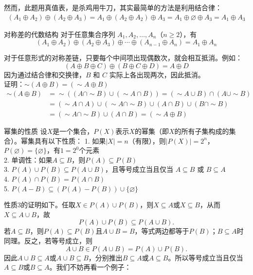 \documentclass[lang=cn,11pt]{elegantbook}
\begin{document}
然而，此题用真值表，是杀鸡用牛刀，其实最简单的方法是利用结合律：
\begin{align*}
(A_1 \oplus A_2) \oplus (A_2 \oplus A_3) = A_1 \oplus (A_2 \oplus A_2) \oplus A_3 = A_1 \oplus \varnothing \oplus A_3  = A_1 \oplus A_3 
\end{align*}
\begin{theorem}{对称差的代数结构}
    对于任意集合序列 $A_1, A_2, \ldots, A_n$（$n\geqslant 2$），有\vspace{-10pt}
$$(A_1 \oplus A_2) \oplus (A_2 \oplus A_3) \oplus \cdots \oplus (A_{n-1} \oplus A_n) = A_1 \oplus A_n$$
\end{theorem}
对于任意形式的对称差链，只要每个中间项出现偶数次，就会相互抵消。例如：
$$(A \oplus B \oplus C) \oplus (B \oplus C \oplus D) = A \oplus D$$
因为通过结合律和交换律，$B$ 和 $C$ 实际上各出现两次，因此抵消。\\
证明：$\sim(A \oplus B) = (\sim A \oplus B)$
\begin{align*}
      \sim(A \oplus B) &= \sim((A\cap \sim B) \cup (\sim A \cap B))=(\sim A\cup B)\cap (A\cup \sim B) \\
      &=(\sim A\cap A)\cup(\sim A\cap\sim B)\cup(A\cap B)\cup(B\cap\sim B)\\
      &=(\sim A\cap\sim B)\cup(A\cap B)= (\sim A \oplus B)
\end{align*}
\begin{theorem}{幂集的性质}
设$X$是一个集合，$P(X)$表示$X$的幂集（即$X$的所有子集构成的集合）。幂集具有以下性质：
1. 如果$|X| = n$（有限），则$|P(X)| = 2^n$，$P(\varnothing) = \{\varnothing\}$，有$1 = 2^0$个元素\\
2. 单调性：如果$A \subseteq B$，则$P(A) \subseteq P(B)$\\
3. $P(A) \cup P(B) \subseteq P(A \cup B)$，且等号成立当且仅当 $A \subseteq B$ 或 $B \subseteq A$\\
4. $P(A) \cap P(B) = P(A \cap B)$\\
5. $ P(A - B) \subseteq (P(A) - P(B))\cup\{\varnothing\}$
\end{theorem}
性质3的证明如下。任取$X\in P(A)\cup P(B)$，则$X\subseteq A$或$X\subseteq B$，从而$X\subseteq A\cup B$，故
\[
P(A)\cup P(B)\subseteq P(A\cup B).
\]
若$A\subseteq B$，则$P(A)\subseteq P(B)$且$A\cup B=B$，等式两边都等于$P(B)$；$B\subseteq A$时同理。反之，若等号成立，则
\[
A\cup B\in P(A\cup B)=P(A)\cup P(B).
\]
因此$A\cup B\subseteq A$或$A\cup B\subseteq B$，分别推出$B\subseteq A$或$A\subseteq B$。所以等号成立当且仅当$A\subseteq B$或$B\subseteq A$。我们不妨再看一个例子：
\end{document}
